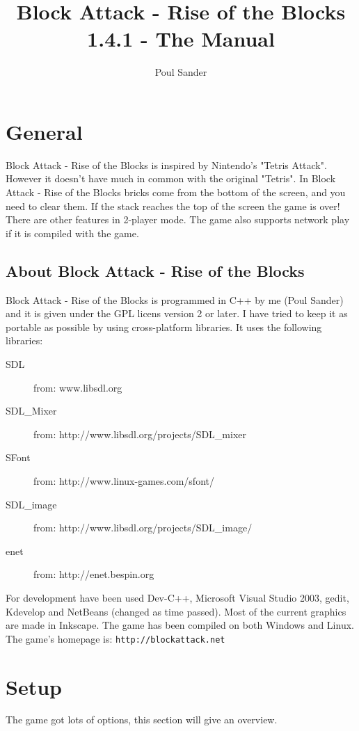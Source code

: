 \documentclass[11pt,a4paper]{article}
\begin{document}
\title{Block Attack - Rise of the Blocks 1.4.1 - The Manual}
\author{Poul Sander}
\maketitle
\tableofcontents
\section{General}
Block Attack - Rise of the Blocks is inspired by Nintendo's
"Tetris Attack". However it doesn't have much in common with the
original "Tetris". In Block Attack - Rise of the Blocks bricks
come from the bottom of the screen, and you need to clear them. If
the stack reaches the top of the screen the game is over! There
are other features in 2-player mode. The game also supports network play 
if it is compiled with the game.
\subsection{About Block Attack - Rise of the Blocks}
Block Attack - Rise of the Blocks is programmed in C++ by me (Poul
Sander) and it is given under the GPL licens version 2 or later. I have tried to keep
it as portable as possible by using cross-platform libraries. It
uses the following libraries:
\begin{description}
\item[SDL] from: \newline www.libsdl.org \item[SDL\_Mixer] from:
\newline http://www.libsdl.org/projects/SDL\_mixer \item[SFont]
from: \newline http://www.linux-games.com/sfont/ \item[SDL\_image]
from: \newline http://www.libsdl.org/projects/SDL\_image/
\item[enet] from: \newline http://enet.bespin.org
\end{description}
For development have been used Dev-C++, Microsoft Visual Studio
2003, gedit, Kdevelop and NetBeans (changed as time passed). Most of the current graphics are made in Inkscape. The
game has been compiled on both Windows and Linux. \newline The
game's homepage is:
\verb+http://blockattack.net+
\section{Setup}
The game got lots of options, this section will give an overview.
\end{document}
